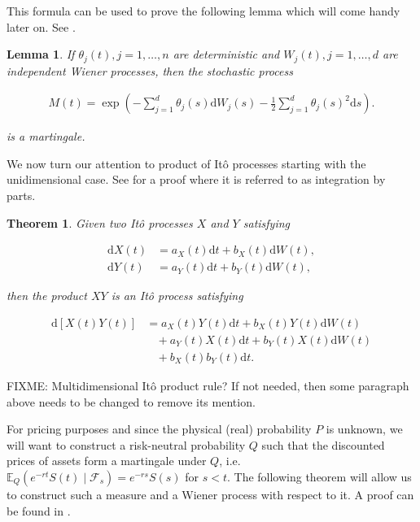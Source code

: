\documentclass[a4paper]{article}
\newtheorem{lemma}[definition]{Lemma}
\newtheorem{theorem}[definition]{Theorem}
\begin{document}
This formula can be used to prove the following lemma which will come handy later on. See \textcite{capinski_blackscholes_2012}.

\begin{lemma}\label{eq:exp-sums-martingale}
  If $\theta_j(t), j=1,\ldots,n$ are deterministic and $W_j(t), j=1,\ldots,d$ are independent Wiener processes, then the stochastic process

  \begin{align*}
    M(t) = \exp \left( - \sum_{j=1}^{d} \theta_j(s) \mathrm{d}W_j(s) - \frac{1}{2} \sum_{j=1}^{d} \theta_j(s)^2 \mathrm{d}s \right).
  \end{align*}

  is a martingale.
\end{lemma}

We now turn our attention to product of It\^o processes starting with the unidimensional case. See \textcite{capinski_stochastic_2012} for a proof where it is referred to as integration by parts.

\begin{theorem}
  Given two It\^o processes $X$ and $Y$ satisfying

  \begin{align*}
    \mathrm{d}X(t) &= a_X(t) \mathrm{d}t + b_X(t) \mathrm{d}W(t),\\
    \mathrm{d}Y(t) &= a_Y(t) \mathrm{d}t + b_Y(t) \mathrm{d}W(t),
  \end{align*}

  then the product $XY$ is an It\^o process satisfying

  \begin{align*}
    \mathrm{d}[X(t) Y(t)]
    &= a_X(t) Y(t) \mathrm{d}t + b_X(t) Y(t) \mathrm{d}W(t)\\
    &\ \ \ \ + a_Y(t) X(t) \mathrm{d}t + b_Y(t) X(t) \mathrm{d}W(t)\\
    &\ \ \ \ + b_X(t) b_Y(t) \mathrm{d}t.
  \end{align*}
\end{theorem}

FIXME: Multidimensional It\^o product rule? If not needed, then some paragraph above needs to be changed to remove its mention.

For pricing purposes and since the physical (real) probability $P$ is unknown, we will want to construct a risk-neutral probability $Q$ such that the discounted prices of assets form a martingale under $Q$, i.e. $\mathbb{E}_Q(e^{-rt}S(t) \mid \mathcal{F}_s) = e^{-rs}S(s)$ for $s < t$. The following theorem will allow us to construct such a measure and a Wiener process with respect to it. A proof can be found in \textcite{capinski_blackscholes_2012}.
\end{document}
